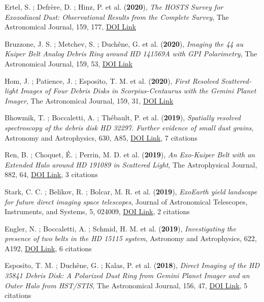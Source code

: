 \documentclass[11pt, a4paper, french]{article}
\begin{document}
\begin{etaremune} \itemsep 0pt

\item Ertel, S. ; Defr{\`e}re, D. ; Hinz, P. et al. ({\bf2020}), {\it The HOSTS Survey for Exozodiacal Dust: Observational Results from the Complete Survey}, The Astronomical Journal, 159, 177, \href{https://doi.org/10.3847/1538-3881/ab7817}{DOI Link}

 \item Bruzzone, J. S. ; Metchev, S. ; Duch{\^e}ne, G. et al. ({\bf2020}), {\it Imaging the 44 au Kuiper Belt Analog Debris Ring around HD 141569A with GPI Polarimetry}, The Astronomical Journal, 159, 53, \href{https://doi.org/10.3847/1538-3881/ab5d2e}{DOI Link}

 \item Hom, J. ; Patience, J. ; Esposito, T. M. et al. ({\bf2020}), {\it First Resolved Scattered-light Images of Four Debris Disks in Scorpius-Centaurus with the Gemini Planet Imager}, The Astronomical Journal, 159, 31, \href{https://doi.org/10.3847/1538-3881/ab5af2}{DOI Link}

 \item Bhowmik, T. ; Boccaletti, A. ; Th{\'e}bault, P. et al. ({\bf2019}), {\it Spatially resolved spectroscopy of the debris disk HD 32297. Further evidence of small dust grains}, Astronomy and Astrophysics, 630, A85, \href{https://doi.org/10.1051/0004-6361/201936076}{DOI Link}, 7 citations

 \item Ren, B. ; Choquet, {\'E}. ; Perrin, M. D. et al. ({\bf2019}), {\it An Exo-Kuiper Belt with an Extended Halo around HD 191089 in Scattered Light}, The Astrophysical Journal, 882, 64, \href{https://doi.org/10.3847/1538-4357/ab3403}{DOI Link}, 3 citations

 \item Stark, C. C. ; Belikov, R. ; Bolcar, M. R. et al. ({\bf2019}), {\it ExoEarth yield landscape for future direct imaging space telescopes}, Journal of Astronomical Telescopes, Instruments, and Systems, 5, 024009, \href{https://doi.org/10.1117/1.JATIS.5.2.024009}{DOI Link}, 2 citations

 \item Engler, N. ; Boccaletti, A. ; Schmid, H. M. et al. ({\bf2019}), {\it Investigating the presence of two belts in the HD 15115 system}, Astronomy and Astrophysics, 622, A192, \href{https://doi.org/10.1051/0004-6361/201833542}{DOI Link}, 6 citations

 \item Esposito, T. M. ; Duch{\^e}ne, G. ; Kalas, P. et al. ({\bf2018}), {\it Direct Imaging of the HD 35841 Debris Disk: A Polarized Dust Ring from Gemini Planet Imager and an Outer Halo from HST/STIS}, The Astronomical Journal, 156, 47, \href{https://doi.org/10.3847/1538-3881/aacbc9}{DOI Link}, 5 citations


\end{etaremune}
\end{document}
